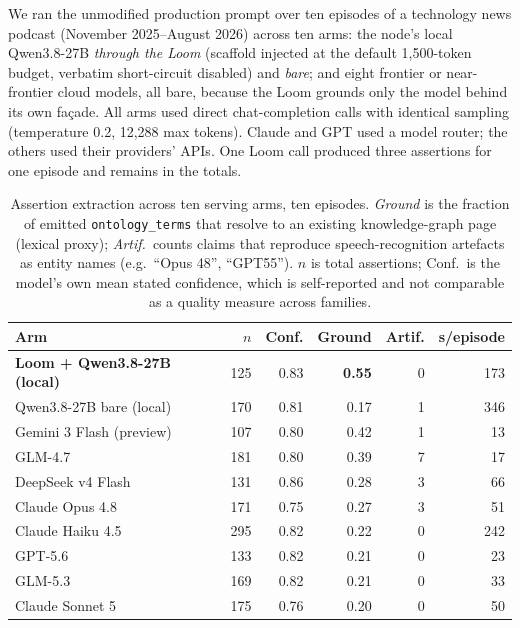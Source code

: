 \documentclass[10pt,twocolumn]{article}
\begin{document}
We ran the unmodified production prompt over ten episodes of a technology news podcast
(November 2025--August 2026) across ten arms: the node's local Qwen3.8-27B \emph{through the
Loom} (scaffold injected at the default 1{,}500-token budget, verbatim short-circuit disabled)
and \emph{bare}; and eight frontier or near-frontier cloud models, all bare, because the Loom
grounds only the model behind its own fa\c{c}ade. All arms used direct chat-completion calls
with identical sampling (temperature 0.2, 12{,}288 max tokens). Claude and GPT used a model
router; the others used their providers' APIs. One Loom call produced three assertions for one
episode and remains in the totals.

\begin{table}[t]\centering\small
\caption{Assertion extraction across ten serving arms, ten episodes. \emph{Ground}
is the fraction of emitted \texttt{ontology\_terms} that resolve to an existing knowledge-graph
page (lexical proxy); \emph{Artif.}\ counts claims that reproduce speech-recognition artefacts as
entity names (e.g.\ ``Opus 48'', ``GPT55''). $n$ is total assertions; Conf.\ is the model's own
mean stated confidence, which is self-reported and not comparable as a quality measure across
families.}
\label{tab:casestudy}
\renewcommand{\arraystretch}{1.15}
\begin{tabular}{@{}lrrrrr@{}}
\toprule
Arm & $n$ & Conf. & Ground & Artif. & s/episode \\
\midrule
\textbf{Loom + Qwen3.8-27B (local)} & 125 & 0.83 & \textbf{0.55} & 0 & 173 \\
Qwen3.8-27B bare (local)            & 170 & 0.81 & 0.17 & 1 & 346 \\
\midrule
Gemini 3 Flash (preview)            & 107 & 0.80 & 0.42 & 1 & 13 \\
GLM-4.7                             & 181 & 0.80 & 0.39 & 7 & 17 \\
DeepSeek v4 Flash                   & 131 & 0.86 & 0.28 & 3 & 66 \\
Claude Opus 4.8                     & 171 & 0.75 & 0.27 & 3 & 51 \\
Claude Haiku 4.5                    & 295 & 0.82 & 0.22 & 0 & 242 \\
GPT-5.6                             & 133 & 0.82 & 0.21 & 0 & 23 \\
GLM-5.3                             & 169 & 0.82 & 0.21 & 0 & 33 \\
Claude Sonnet 5                     & 175 & 0.76 & 0.20 & 0 & 50 \\
\bottomrule
\end{tabular}
\end{table}
\end{document}
